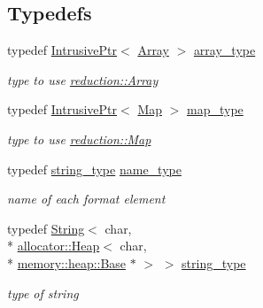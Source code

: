 \subsection*{Typedefs}
\begin{DoxyCompactItemize}
\item 
\hypertarget{namespacehryky_1_1reduction_ad7a80870a94be0b91740690d01a72d4d}{typedef \hyperlink{classhryky_1_1_intrusive_ptr}{Intrusive\-Ptr}$<$ \hyperlink{classhryky_1_1reduction_1_1_array}{Array} $>$ \hyperlink{namespacehryky_1_1reduction_ad7a80870a94be0b91740690d01a72d4d}{array\-\_\-type}}\label{namespacehryky_1_1reduction_ad7a80870a94be0b91740690d01a72d4d}

\begin{DoxyCompactList}\small\item\em type to use \hyperlink{classhryky_1_1reduction_1_1_array}{reduction\-::\-Array} \end{DoxyCompactList}\item 
\hypertarget{namespacehryky_1_1reduction_a64228de3f2cff9ed9d5ad836a120c7f7}{typedef \hyperlink{classhryky_1_1_intrusive_ptr}{Intrusive\-Ptr}$<$ \hyperlink{classhryky_1_1reduction_1_1_map}{Map} $>$ \hyperlink{namespacehryky_1_1reduction_a64228de3f2cff9ed9d5ad836a120c7f7}{map\-\_\-type}}\label{namespacehryky_1_1reduction_a64228de3f2cff9ed9d5ad836a120c7f7}

\begin{DoxyCompactList}\small\item\em type to use \hyperlink{classhryky_1_1reduction_1_1_map}{reduction\-::\-Map} \end{DoxyCompactList}\item 
\hypertarget{namespacehryky_1_1reduction_ac686c30a4c8d196bbd0f05629a6b921f}{typedef \hyperlink{namespacehryky_1_1reduction_a4314fd3d5c8dd6a515a10de4861a998f}{string\-\_\-type} \hyperlink{namespacehryky_1_1reduction_ac686c30a4c8d196bbd0f05629a6b921f}{name\-\_\-type}}\label{namespacehryky_1_1reduction_ac686c30a4c8d196bbd0f05629a6b921f}

\begin{DoxyCompactList}\small\item\em name of each format element \end{DoxyCompactList}\item 
\hypertarget{namespacehryky_1_1reduction_a4314fd3d5c8dd6a515a10de4861a998f}{typedef \hyperlink{classhryky_1_1reduction_1_1_string}{String}$<$ char, \\*
\hyperlink{classhryky_1_1allocator_1_1_heap}{allocator\-::\-Heap}$<$ char, \\*
\hyperlink{classhryky_1_1memory_1_1heap_1_1_base}{memory\-::heap\-::\-Base} $\ast$ $>$ $>$ \hyperlink{namespacehryky_1_1reduction_a4314fd3d5c8dd6a515a10de4861a998f}{string\-\_\-type}}\label{namespacehryky_1_1reduction_a4314fd3d5c8dd6a515a10de4861a998f}

\begin{DoxyCompactList}\small\item\em type of string \end{DoxyCompactList}\end{DoxyCompactItemize}
